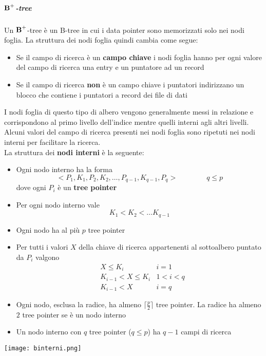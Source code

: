 \newpage
\subparagraph{$\text{\textbf{B}}^\mathbf{+}$-tree}
Un $\text{\textbf{B}}^\mathbf{+}$-tree è un B-tree in cui i data pointer sono memorizzati solo nei nodi foglia. La struttura dei nodi foglia quindi cambia come segue:
\begin{itemize}
	\item Se il campo di ricerca è un \textbf{campo chiave} i nodi foglia hanno per ogni valore del campo di ricerca una entry e un puntatore ad un record
	\item Se il campo di ricerca \textbf{non} è un campo chiave i puntatori indirizzano un blocco che contiene i puntatori a record dei file di dati
\end{itemize}
I nodi foglia di questo tipo di albero vengono generalmente messi in relazione e corrispondono al primo livello dell'indice mentre quelli interni agli altri livelli. Alcuni valori del campo di ricerca presenti nei nodi foglia sono ripetuti nei nodi interni per facilitare la ricerca.\\
La struttura dei \textbf{nodi interni} è la seguente:
\begin{itemize}
	\item Ogni nodo interno ha la forma
	\begin{equation*}
		<P_1, K_1, P_2, K_2, \ldots, P_{q-1}, K_{q-1}, P_q > \qquad\qquad q \leq p
	\end{equation*}
	dove ogni $P_i$ è un \textbf{tree pointer}
	\item Per ogni nodo interno vale
	\begin{equation*}
		K_1 < K_2 < \ldots K_{q-1}
	\end{equation*}
	\item Ogni nodo ha al più $p$ tree pointer
	\item Per tutti i valori $X$ della chiave di ricerca appartenenti al sottoalbero puntato da $P_i$ valgono
	\begin{align*}
	& X \leq K_i & i = 1\\
	& K_{i-1} < X \leq K_i & 1 < i < q \\
	& K_{i-1} < X & i=q
	\end{align*}
	\item Ogni nodo, esclusa la radice, ha almeno $\lceil \frac{p}{2} \rceil$ tree pointer. La radice ha almeno $2$ tree pointer se è un nodo interno
	\item Un nodo interno con $q$ tree pointer ($q \leq p$) ha $q-1$ campi di ricerca
\end{itemize}
\begin{center}
	\texttt{[image: binterni.png]}
\end{center}

